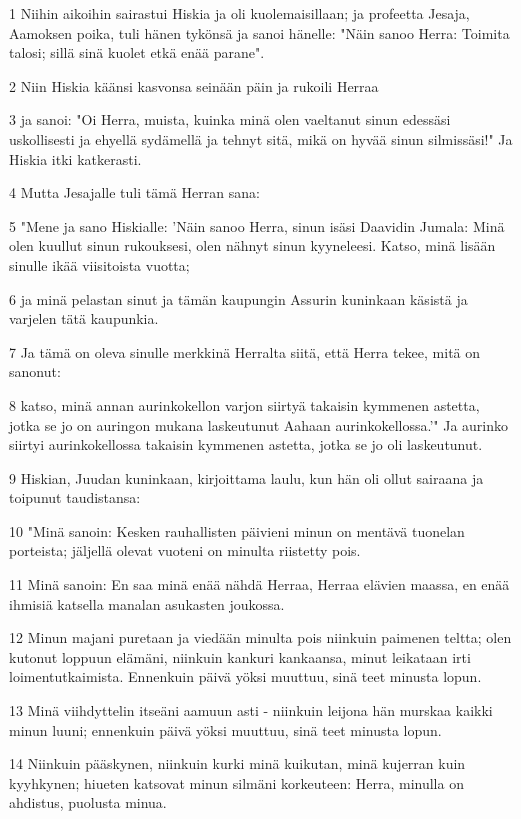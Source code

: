 \par 1 Niihin aikoihin sairastui Hiskia ja oli kuolemaisillaan; ja profeetta Jesaja, Aamoksen poika, tuli hänen tykönsä ja sanoi hänelle: "Näin sanoo Herra: Toimita talosi; sillä sinä kuolet etkä enää parane".
\par 2 Niin Hiskia käänsi kasvonsa seinään päin ja rukoili Herraa
\par 3 ja sanoi: "Oi Herra, muista, kuinka minä olen vaeltanut sinun edessäsi uskollisesti ja ehyellä sydämellä ja tehnyt sitä, mikä on hyvää sinun silmissäsi!" Ja Hiskia itki katkerasti.
\par 4 Mutta Jesajalle tuli tämä Herran sana:
\par 5 "Mene ja sano Hiskialle: 'Näin sanoo Herra, sinun isäsi Daavidin Jumala: Minä olen kuullut sinun rukouksesi, olen nähnyt sinun kyyneleesi. Katso, minä lisään sinulle ikää viisitoista vuotta;
\par 6 ja minä pelastan sinut ja tämän kaupungin Assurin kuninkaan käsistä ja varjelen tätä kaupunkia.
\par 7 Ja tämä on oleva sinulle merkkinä Herralta siitä, että Herra tekee, mitä on sanonut:
\par 8 katso, minä annan aurinkokellon varjon siirtyä takaisin kymmenen astetta, jotka se jo on auringon mukana laskeutunut Aahaan aurinkokellossa.'" Ja aurinko siirtyi aurinkokellossa takaisin kymmenen astetta, jotka se jo oli laskeutunut.
\par 9 Hiskian, Juudan kuninkaan, kirjoittama laulu, kun hän oli ollut sairaana ja toipunut taudistansa:
\par 10 "Minä sanoin: Kesken rauhallisten päivieni minun on mentävä tuonelan porteista; jäljellä olevat vuoteni on minulta riistetty pois.
\par 11 Minä sanoin: En saa minä enää nähdä Herraa, Herraa elävien maassa, en enää ihmisiä katsella manalan asukasten joukossa.
\par 12 Minun majani puretaan ja viedään minulta pois niinkuin paimenen teltta; olen kutonut loppuun elämäni, niinkuin kankuri kankaansa, minut leikataan irti loimentutkaimista. Ennenkuin päivä yöksi muuttuu, sinä teet minusta lopun.
\par 13 Minä viihdyttelin itseäni aamuun asti - niinkuin leijona hän murskaa kaikki minun luuni; ennenkuin päivä yöksi muuttuu, sinä teet minusta lopun.
\par 14 Niinkuin pääskynen, niinkuin kurki minä kuikutan, minä kujerran kuin kyyhkynen; hiueten katsovat minun silmäni korkeuteen: Herra, minulla on ahdistus, puolusta minua.
